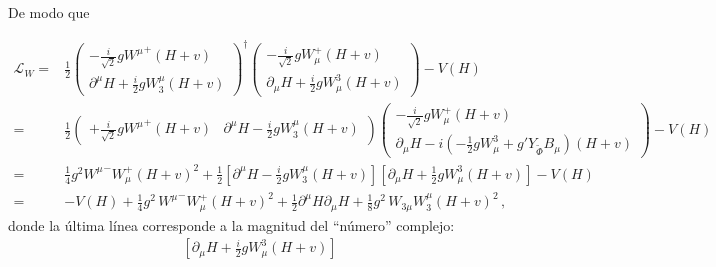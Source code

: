 De modo que %

\begin{align}
  \mathcal{L}_{W}=&\frac{1}{2}\begin{pmatrix}
    -\frac{i}{\sqrt{2}}g{W^\mu}^+(H+v)\\
    \partial^\mu H+\frac{i}{2}gW_3^\mu(H+v)
  \end{pmatrix}^{\dagger}
   \begin{pmatrix}
    -\frac{i}{\sqrt{2}}gW_\mu^+(H+v)\\
    \partial_\mu H+\frac{i}{2}gW^3_\mu(H+v)
  \end{pmatrix}-V(H)\nonumber\\
=&\frac{1}{2}\begin{pmatrix}
    +\frac{i}{\sqrt{2}}g{W^\mu}^+(H+v)&
    \partial^\mu H-\frac{i}{2}gW_3^\mu(H+v)
  \end{pmatrix}
  \begin{pmatrix}
    -\frac{i}{\sqrt{2}}gW_\mu^+(H+v)\\
    \partial_\mu H-i\left(-\frac{1}{2}gW^3_\mu+g'Y_{\widetilde{\Phi}} B_\mu\right)(H+v)
  \end{pmatrix}-V(H)\nonumber\\
  =&\frac{1}{4}g^2{W^\mu}^-W_\mu^+(H+v)^2+\frac{1}{2}\left[\partial^\mu H-\tfrac{i}{2}gW_3^\mu(H+v)\right]\left[\partial_\mu H      +\tfrac{1}{2}gW^3_\mu(H+v)\right]-V(H)\nonumber\\
 =&-V(H)
  +\frac{1}{4}g^2\,{W^\mu}^-W_\mu^+(H+v)^2+
  \frac{1}{2}\partial^\mu H\partial_\mu H+\frac{1}{8}g^2\,W_{3\mu} W_3^{\mu}(H+v)^2\,,
\end{align}
donde la última línea corresponde a la magnitud del ``número'' complejo: 
\begin{align}
\left[\partial_\mu H+\tfrac{i}{2}gW^3_\mu(H+v)\right]
\end{align}


